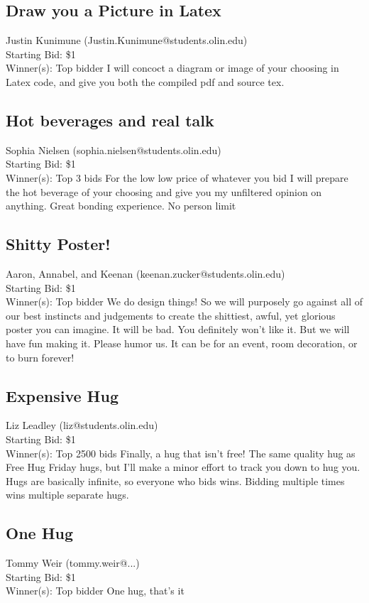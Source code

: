 \documentclass[11pt]{article}
\begin{document}
\subsection{Draw you a Picture in Latex}
Justin Kunimune (Justin.Kunimune@students.olin.edu) \\
Starting Bid: \$1 \\
Winner(s): 
Top bidder\newline
I will concoct a diagram or image of your choosing in Latex code, and give you both the compiled pdf and source tex.
\subsection{Hot beverages and real talk}
Sophia Nielsen (sophia.nielsen@students.olin.edu) \\
Starting Bid: \$1 \\
Winner(s): 
Top 3 bids\newline
For the low low price of whatever you bid I will prepare the hot beverage of your choosing and give you my unfiltered opinion on anything. Great bonding experience. No person limit
\subsection{Shitty Poster!}
Aaron, Annabel, and Keenan (keenan.zucker@students.olin.edu) \\
Starting Bid: \$1 \\
Winner(s): 
Top bidder\newline
We do design things! So we will purposely go against all of our best instincts and judgements to create the shittiest, awful, yet glorious poster you can imagine. It will be bad. You definitely won't like it. But we will have fun making it. Please humor us. It can be for an event, room decoration, or to burn forever!
\subsection{Expensive Hug}
Liz Leadley (liz@students.olin.edu) \\
Starting Bid: \$1 \\
Winner(s): 
Top 2500 bids\newline
Finally, a hug that isn't free! The same quality hug as Free Hug Friday hugs, but I'll make a minor effort to track you down to hug you.
Hugs are basically infinite, so everyone who bids wins. Bidding multiple times wins multiple separate hugs.
\subsection{One Hug}
Tommy Weir (tommy.weir@...) \\
Starting Bid: \$1 \\
Winner(s): 
Top bidder\newline
One hug, that's it
\end{document}
